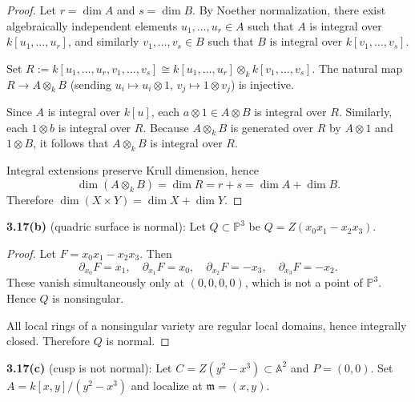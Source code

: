 \documentclass[12pt]{article}
\numberwithin{thm}{subsection}
\numberwithin{defn}{subsection}
\numberwithin{lemma}{subsection}
\numberwithin{example}{subsection}
\numberwithin{notation}{subsection}
\numberwithin{cor}{subsection}
\numberwithin{remark}{subsection}
\numberwithin{condition}{subsection}
\numberwithin{question}{subsection}
\numberwithin{construction}{subsection}
\numberwithin{construction}{subsection}
\numberwithin{construction}{subsection}
\begin{document}
\begin{proof}
Let $r=\dim A$ and $s=\dim B$.
By Noether normalization, there exist algebraically independent elements $u_1,\dots,u_r\in A$ such that
$A$ is integral over $k[u_1,\dots,u_r]$, and similarly $v_1,\dots,v_s\in B$ such that
$B$ is integral over $k[v_1,\dots,v_s]$.

Set $R:=k[u_1,\dots,u_r,v_1,\dots,v_s]\cong k[u_1,\dots,u_r]\otimes_k k[v_1,\dots,v_s]$.
The natural map $R\to A\otimes_k B$ (sending $u_i\mapsto u_i\otimes 1$, $v_j\mapsto 1\otimes v_j$) is injective.

Since $A$ is integral over $k[u]$, each $a\otimes 1\in A\otimes B$ is integral over $R$.
Similarly, each $1\otimes b$ is integral over $R$.
Because $A\otimes_k B$ is generated over $R$ by $A\otimes 1$ and $1\otimes B$, it follows that $A\otimes_k B$ is integral over $R$.

Integral extensions preserve Krull dimension, hence
\[
\dim(A\otimes_k B)=\dim R=r+s=\dim A+\dim B.
\]
Therefore $\dim(X\times Y)=\dim X+\dim Y$.
\end{proof}

\bigskip

\textbf{3.17(b)} (quadric surface is normal):
Let $Q\subset \mathbb P^3$ be $Q=Z(x_0x_1-x_2x_3)$.

\begin{proof}
Let $F=x_0x_1-x_2x_3$. Then
\[
\partial_{x_0}F=x_1,\quad \partial_{x_1}F=x_0,\quad \partial_{x_2}F=-x_3,\quad \partial_{x_3}F=-x_2.
\]
These vanish simultaneously only at $(0,0,0,0)$, which is not a point of $\mathbb P^3$.
Hence $Q$ is nonsingular.

All local rings of a nonsingular variety are regular local domains, hence integrally closed.
Therefore $Q$ is normal.
\end{proof}

\bigskip

\textbf{3.17(c)} (cusp is not normal):
Let $C=Z(y^2-x^3)\subset \mathbb A^2$ and $P=(0,0)$.
Set $A=k[x,y]/(y^2-x^3)$ and localize at $\mathfrak m=(x,y)$.
\end{document}
